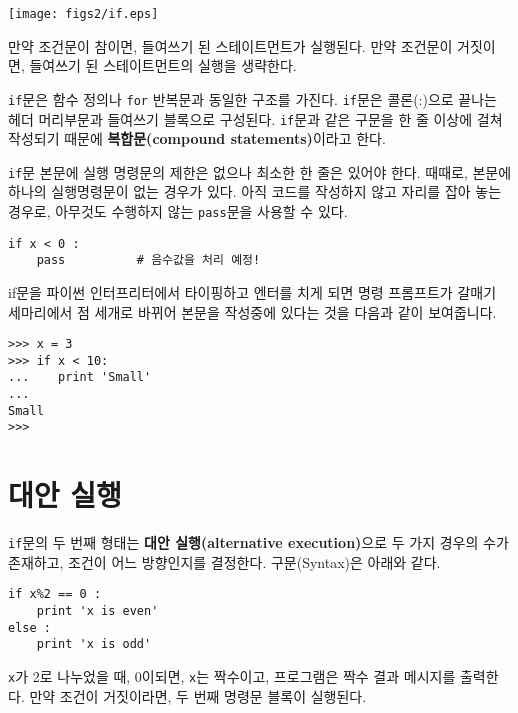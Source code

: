 \beforefig
\centerline{\texttt{[image: figs2/if.eps]}}
\afterfig

만약 조건문이 참이면, 들여쓰기 된 스테이트먼트가 실행된다. 만약 조건문이 거짓이면, 들여쓰기 된 스테이트먼트의 실행을 생략한다.


{\tt if}문은 함수 정의나 {\tt for} 반복문과 동일한 구조를 가진다.
{\tt if}문은 콜론(:)으로 끝나는 헤더 머리부문과 들여쓰기 블록으로 구성된다.
{\tt if}문과 같은 구문을 한 줄 이상에 걸쳐 작성되기 때문에 {\bf 복합문(compound statements)}이라고 한다.

{\tt if}문 본문에 실행 명령문의 제한은 없으나 최소한 한 줄은 있어야 한다.
때때로, 본문에 하나의 실행명령문이 없는 경우가 있다. 아직 코드를 작성하지 않고 자리를 잡아 놓는 경우로, 아무것도 수행하지 않는 {\tt pass}문을 사용할 수 있다.


\beforeverb
\begin{verbatim}
if x < 0 :
    pass          # 음수값을 처리 예정!
\end{verbatim}
\afterverb
%
if문을 파이썬 인터프리터에서 타이핑하고 엔터를 치게 되면 명령 프롬프트가 갈매기 세마리에서 점 세개로 바뀌어 본문을 작성중에 있다는 것을 다음과 같이 보여줍니다.

\beforeverb
\begin{verbatim}
>>> x = 3
>>> if x < 10:
...    print 'Small'
... 
Small
>>>
\end{verbatim}
\afterverb
%

\section{대안 실행}


{\tt if}문의 두 번째 형태는 {\bf 대안 실행(alternative execution)}으로 두 가지 경우의 수가 존재하고, 조건이 어느 방향인지를 결정한다. 구문(Syntax)은 아래와 같다.   

\beforeverb
\begin{verbatim}
if x%2 == 0 :
    print 'x is even'
else :
    print 'x is odd'
\end{verbatim}
\afterverb
%
{\tt x}가 2로 나누었을 때, 0이되면, {\tt x}는 짝수이고, 프로그램은 짝수 결과 메시지를 출력한다. 만약 조건이 거짓이라면, 두 번째 명령문 블록이 실행된다.

